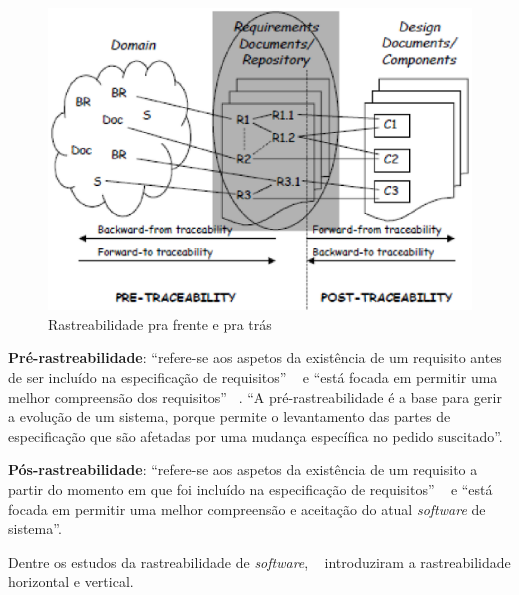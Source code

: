 \begin{figure}[htb]
\centering
  \includegraphics[keepaspectratio=true,scale=0.5]
  {figuras/rastreabilidade_frente_tras.eps}
  \caption{Rastreabilidade pra frente e pra trás ~\cite{dahlstedt}}
  \label{back-and-foward}
\end{figure}

\clearpage{}

\textbf{Pré-rastreabilidade}: “refere-se aos aspetos da existência de um requisito antes de ser incluído na especificação de requisitos” ~\cite{gotel} e “está focada em permitir uma melhor compreensão dos requisitos” ~\cite{persson}. “A pré-rastreabilidade é a base para gerir a evolução de um sistema, porque permite o levantamento das partes de especificação que são afetadas por uma mudança específica no pedido suscitado”.~\cite{persson}

\textbf{Pós-rastreabilidade}: “refere-se aos aspetos da existência de um requisito a partir do momento em que foi incluído na especificação de requisitos” ~\cite{gotel} e “está focada em permitir uma melhor compreensão e aceitação do atual \textit{software} de sistema”. ~\cite{persson}

Dentre os estudos da rastreabilidade de \textit{software}, ~\cite{ramesh} introduziram a rastreabilidade horizontal e vertical.

